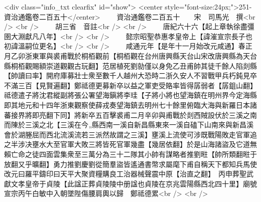 <div class="info_txt clearfix" id="show">
<center style="font-size:24px;">251-資治通鑑卷二百五十</center>
  　　資治通鑑卷二百五十　　宋　司馬光　撰<br />
<br />
　　胡三省　音註<br />
<br />
　　唐紀六十六【起上章執徐盡彊圉大淵獻凡八年】<br />
<br />
　　懿宗昭聖恭惠孝皇帝上【諱漼宣宗長子也初諱溫嗣位更名】<br />
<br />
　　咸通元年【是年十一月始改元咸通】春正月乙卯浙東軍與裘甫戰於桐栢觀前【桐栢觀在台州唐興縣天台山宋改唐興縣為天台縣桐栢觀賜額崇道觀觀古玩翻】范居植死劉勍僅以身免乙丑甫帥其徒千餘人陷剡縣【帥讀曰率】開府庫募壯士衆至數千人越州大恐時二浙久安人不習戰甲兵朽鈍見卒不滿三百【見賢遍翻】鄭祗德更募新卒以益之軍吏受賂率皆得孱弱者【孱鉏山翻】祗德遣子將沈君縱副將張公署望海鎭將李珪【子將小將也望海鎮在明州界今定海縣即其地元和十四年浙東觀察使薛戎奏望海鎮去明州七十餘里俯臨大海與新羅日本諸蕃接界將即亮翻下同】將新卒五百擊裘甫二月辛卯與甫戰於剡西賊設伏於三溪之南而陳於三溪之北【三溪在今縣西南一溪自新昌縣東來一溪自磕下山南來與新昌溪會於湖塍屈而西北流溪流若三派然故謂之三溪】壅溪上流使可涉既戰陽敗走官軍追之半涉决壅水大至官軍大敗三將皆死官軍幾盡【幾居依翻】於是山海諸盜及它道無賴亡命之徒四面雲集衆至三萬分為三十二隊其小帥有謀略者推劉暀【帥所類翻暀于放翻又乎曠翻】勇力推劉慶劉從簡羣盜皆遙通書幣求屬麾下甫自稱天下都知兵馬使改元曰羅平鑄印曰天平大聚資糧購良工治器械聲震中原【治直之翻】　丙申葬聖武獻文孝皇帝于貞陵【此諡正葬貞陵陵中册諡也貞陵在京兆雲陽縣西北四十里】廟號宣宗丙午白敏中入朝墜陛傷腰肩輿以歸　鄭祗德累<br />
<br />
